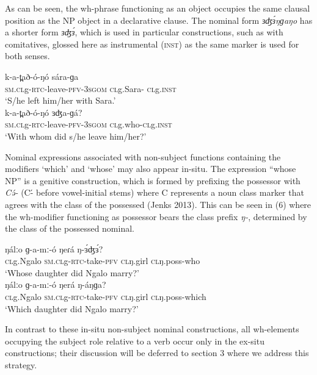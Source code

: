 As can be seen, the wh-phrase functioning as an object occupies the same clausal position as the NP object in a declarative clause.
The nominal form \textit{ɜʤɜ́ŋɡaŋo} has a shorter form \textit{ɜʤɜ́}, which is used in particular constructions, such as with comitatives, glossed here as instrumental (\textsc{inst}) as the same marker is used for both senses. 

\ea
\ea \gll k-a-t̪að-ó-ŋó		sára-ɡa\\
\textsc{sm.cl}g-\textsc{rtc}-leave-\textsc{pfv}-3\textsc{sgom}	\textsc{cl}g.Sara- \textsc{cl}g.\textsc{inst}\\
\trans ‘S/he left him/her with Sara.’\\
\ex	\gll k-a-t̪að-ó-ŋó		ɜʤa-ɡá?\\
\textsc{sm.cl}g-\textsc{rtc}-leave-\textsc{pfv}-3\textsc{sgom}	\textsc{cl}g.who-\textsc{cl}g.\textsc{inst}\\
\trans ‘With whom did s/he leave him/her?’\\
\z
\z

Nominal expressions associated with non-subject functions containing the modifiers ‘which’ and ‘whose’ may also appear in-situ. The expression “whose NP” is a genitive construction, which is formed by prefixing the possessor with \textit{Cə́-} (C-́ before vowel-initial stems) where C represents a noun class marker that agrees with the class of the possessed (Jenks 2013).  This can be seen in (6) where the wh-modifier functioning as possessor bears the class prefix \textit{ŋ-}, determined by the class of the possessed nominal.  

\ea

\ea \gll	ŋálːo	ɡ-a-mː-ó	ŋeɾá	ŋ-ɜ́ʤɜ́?\\
		\textsc{cl}g.Ngalo	\textsc{sm.cl}g-\textsc{rtc}-take-\textsc{pfv}	\textsc{cl}ŋ.girl	\textsc{cl}ŋ.poss-who\\
\trans		‘Whose daughter did Ngalo marry?’\\
\ex	\gll ŋálːo	ɡ-a-mː-ó	ŋerá	ŋ-áŋɡa?\\
		\textsc{cl}g.Ngalo 	\textsc{sm.cl}g-\textsc{rtc}-take-\textsc{pfv}	\textsc{cl}ŋ.girl	\textsc{cl}ŋ.poss-which\\
\trans		‘Which daughter did Ngalo marry?’\\
\z
\z

In contrast to these in-situ non-subject nominal constructions, all wh-elements occupying the subject role relative to a verb occur only in the ex-situ constructions; their discussion will be deferred to section 3 where we address this strategy.
	

